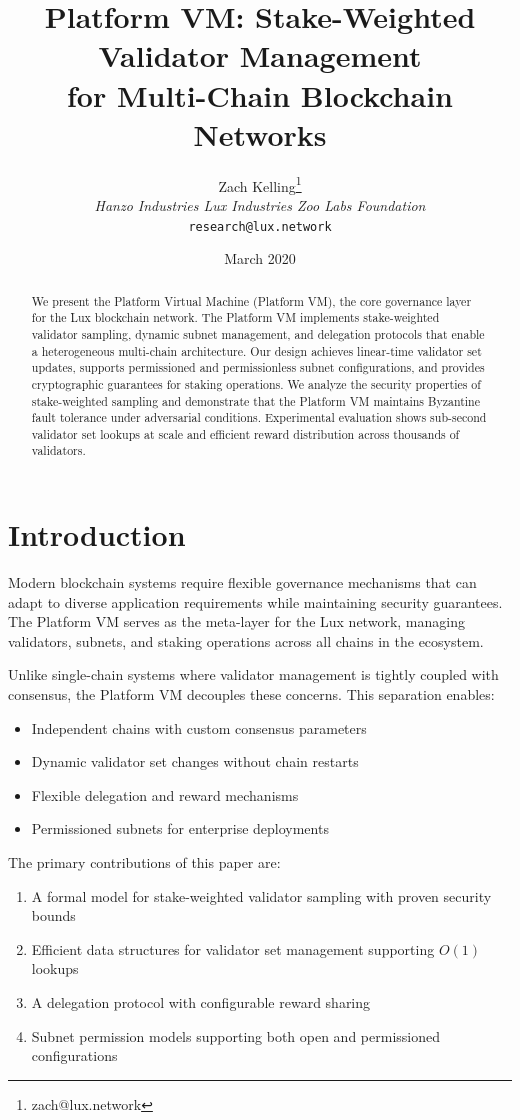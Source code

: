 \documentclass[11pt,letterpaper]{article}
\title{Platform VM: Stake-Weighted Validator Management\\for Multi-Chain Blockchain Networks}
\author{Zach Kelling\thanks{zach@lux.network} \\ \textit{Hanzo Industries \quad Lux Industries \quad Zoo Labs Foundation} \\ \texttt{research@lux.network}}
\date{March 2020}
\begin{document}
\maketitle

\begin{abstract}
We present the Platform Virtual Machine (Platform VM), the core governance layer for the Lux blockchain network. The Platform VM implements stake-weighted validator sampling, dynamic subnet management, and delegation protocols that enable a heterogeneous multi-chain architecture. Our design achieves linear-time validator set updates, supports permissioned and permissionless subnet configurations, and provides cryptographic guarantees for staking operations. We analyze the security properties of stake-weighted sampling and demonstrate that the Platform VM maintains Byzantine fault tolerance under adversarial conditions. Experimental evaluation shows sub-second validator set lookups at scale and efficient reward distribution across thousands of validators.
\end{abstract}

\section{Introduction}

Modern blockchain systems require flexible governance mechanisms that can adapt to diverse application requirements while maintaining security guarantees. The Platform VM serves as the meta-layer for the Lux network, managing validators, subnets, and staking operations across all chains in the ecosystem.

Unlike single-chain systems where validator management is tightly coupled with consensus, the Platform VM decouples these concerns. This separation enables:
\begin{itemize}
    \item Independent chains with custom consensus parameters
    \item Dynamic validator set changes without chain restarts
    \item Flexible delegation and reward mechanisms
    \item Permissioned subnets for enterprise deployments
\end{itemize}

The primary contributions of this paper are:
\begin{enumerate}
    \item A formal model for stake-weighted validator sampling with proven security bounds
    \item Efficient data structures for validator set management supporting $O(1)$ lookups
    \item A delegation protocol with configurable reward sharing
    \item Subnet permission models supporting both open and permissioned configurations
\end{enumerate}
\end{document}

